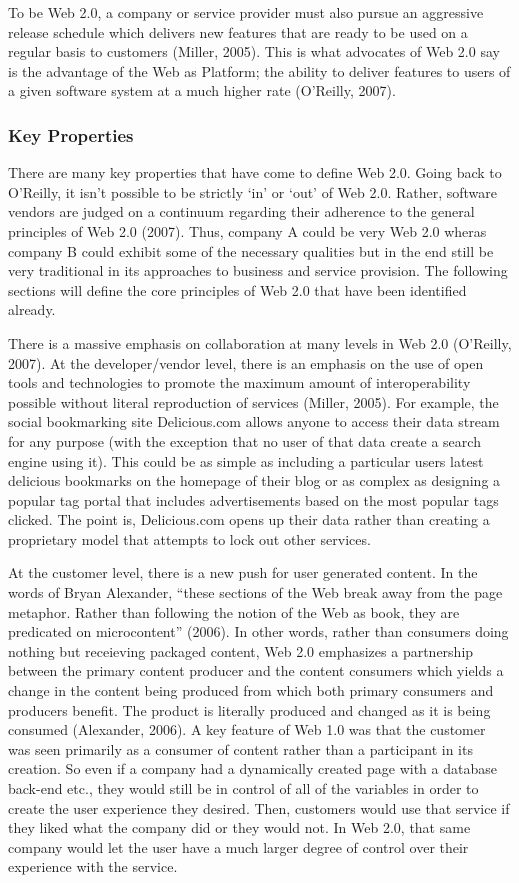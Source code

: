 \documentclass[12pt,oneside,letterpaper]{article}
\begin{document}
To be Web 2.0, a company or service provider must also pursue an aggressive
release schedule which delivers new features that are ready to be used on a
regular basis to customers (Miller, 2005).  This is what advocates of Web 2.0
say is the advantage of the Web as Platform; the ability to deliver features to
users of a given software system at a much higher rate (O'Reilly, 2007).

\subsubsection{Key Properties}

There are many key properties that have come to define Web 2.0.  Going back to
O'Reilly, it isn't possible to be strictly `in' or `out' of Web 2.0.  Rather,
software vendors are judged on a continuum regarding their adherence to the
general principles of Web 2.0 (2007).  Thus, company A could be very Web 2.0
wheras company B could exhibit some of the necessary qualities but in the end
still be very traditional in its approaches to business and service provision.
The following sections will define the core principles of Web 2.0 that have been
identified already.

There is a massive emphasis on collaboration at many levels in Web 2.0
(O'Reilly, 2007).  At the developer/vendor level, there is an emphasis on the
use of open tools and technologies to promote the maximum amount of
interoperability possible without literal reproduction of services (Miller,
2005).  For example, the social bookmarking site Delicious.com allows anyone to
access their data stream for any purpose (with the exception that no user of
that data create a search engine using it).  This could be as simple as
including a particular users latest delicious bookmarks on the homepage of their
blog or as complex as designing a popular tag portal that includes
advertisements based on the most popular tags clicked.  The point is,
Delicious.com opens up their data rather than creating a proprietary model that
attempts to lock out other services.

At the customer level, there is a new push for user generated content.  In the
words of Bryan Alexander, ``these sections of the Web break away from the page
metaphor. Rather than following the notion of the Web as book, they are
predicated on microcontent'' (2006).  In other words, rather than consumers doing
nothing but receieving packaged content, Web 2.0 emphasizes a partnership
between the primary content producer and the content consumers which yields a
change in the content being produced from which both primary consumers and
producers benefit.  The product is literally produced and changed as it is being
consumed (Alexander, 2006).  A key feature of Web 1.0 was that the customer was
seen primarily as a consumer of content rather than a participant in its
creation.  So even if a company had a dynamically created page with a database
back-end etc., they would still be in control of all of the variables in order
to create the user experience they desired.  Then, customers would use that
service if they liked what the company did or they would not.  In Web 2.0, that
same company would let the user have a much larger degree of control over their
experience with the service.
\end{document}

